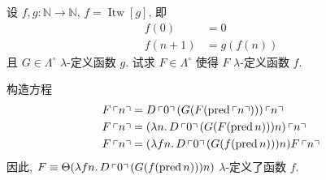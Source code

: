 \begin{problem}
设 $f, g : \mathbb{N} \to \mathbb{N}$, $f = \operatorname{Itw}[g]$, 即
\begin{align*}
f(0) & = 0 \\
f(n+1) & = g(f(n))
\end{align*}
且 $G \in \Lambda^\circ$ $\lambda$-定义函数 $g$. 试求 $F \in \Lambda^\circ$  使得 $F$ $\lambda$-定义函数 $f$.
\end{problem}

\begin{solution}
构造方程
\begin{align*}
F \left\ulcorner n \right\urcorner & = D \left\ulcorner 0 \right\urcorner (G (F (\operatorname{pred} \left\ulcorner n \right\urcorner))) \left\ulcorner n \right\urcorner \\
F \left\ulcorner n \right\urcorner & = (\lambda {n}.\,{D \left\ulcorner 0 \right\urcorner (G (F (\operatorname{pred} n))) n}) \left\ulcorner n \right\urcorner \\
F \left\ulcorner n \right\urcorner & = (\lambda {fn}.\,{D \left\ulcorner 0 \right\urcorner (G (f (\operatorname{pred} n))) n}) F \left\ulcorner n \right\urcorner
\end{align*}
因此, $F \equiv \Theta (\lambda {fn}.\,{D \left\ulcorner 0 \right\urcorner (G (f (\operatorname{pred} n))) n})$ $\lambda$-定义了函数 $f$.
\end{solution}
